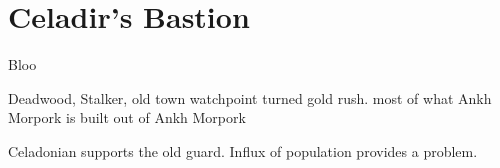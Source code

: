 \section{Celadir's Bastion}\label{sec:celadir'sBastion}
Bloo


Deadwood, Stalker, old town watchpoint turned gold rush.
most of what Ankh Morpork is built out of Ankh Morpork


Celadonian supports the old guard.
Influx of population provides a problem.

